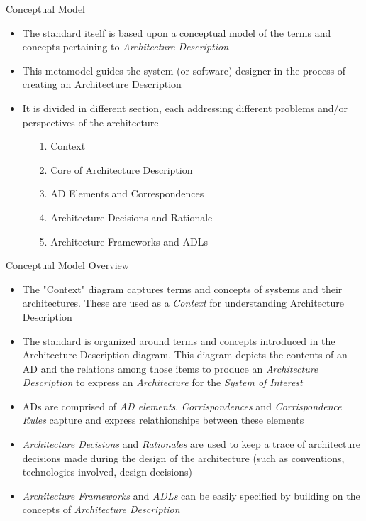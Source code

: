 		\begin{frame}
			\begin{block}{Conceptual Model}
			\vspace{0.2cm}
				\begin{itemize}
				\item The standard itself is based upon a conceptual model of the terms and concepts pertaining to \emph{Architecture Description}
				\item This metamodel guides the system (or software) designer in the process of creating an Architecture Description
				\item It is divided in different section, each addressing different problems and/or perspectives of the architecture
					\begin{itemize}
						\item[1.] Context
						\item[2.] Core of Architecture Description
						\item[3.] AD Elements and Correspondences
						\item[4.] Architecture Decisions and Rationale
						\item[5.] Architecture Frameworks and ADLs
					\end{itemize}
				\end{itemize}
				\vspace{0.2cm}
			\end{block}
		\end{frame}
		
		\begin{frame}
			\begin{block}{Conceptual Model Overview}
				\begin{itemize}
					\item The "Context" diagram captures terms and concepts of systems and their architectures. These are used as a \emph{Context} for understanding Architecture Description
					\item The standard is organized around terms and concepts introduced in the Architecture Description diagram. This diagram depicts the contents of an AD and the relations among those items to produce an \emph{Architecture Description} to express an \emph{Architecture} for the \emph{System of Interest}
					\item ADs are comprised of \emph{AD elements}. \emph{Corrispondences} and \emph{Corrispondence Rules} capture and express relathionships between these elements
					\item \emph{Architecture Decisions} and \emph{Rationales} are used to keep a trace of architecture decisions made during the design of the architecture (such as conventions, technologies involved, design decisions)
					\item \emph{Architecture Frameworks} and \emph{ADLs} can be easily specified by building on the concepts of \emph{Architecture Description}
				\end{itemize}
			\end{block}
		\end{frame}
		
